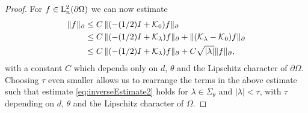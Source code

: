 \begin{proof}
  For $f \in \mathrm{L}^2_n(\partial\Omega)$ we can now estimate
  \begin{align*}
    \| f\|_\partial 
    &\leq C\,  \|(-(1/2)I + \mathcal{K}_0) f \|_\partial  \\
    &\leq C\,  \|(-(1/2)I + \mathcal{K}_\lambda)f \|_\partial + \|(\mathcal{K}_\lambda - \mathcal{K}_0)f\|_\partial \\
    &\leq C\,  \|(-(1/2)I + \mathcal{K}_\lambda)f\|_\partial + C \sqrt{|\lambda|} \|f\|_\partial,
  \end{align*}
  with a constant $C$ which depends only on $d$, $\theta$ and the Lipschitz character of $\partial\Omega$.
  Choosing $\tau$ even smaller allows us to rearrange the terms in the above estimate such that estimate \eqref{eq:inverseEstimate2} holds for $\lambda \in \Sigma_\theta$ and $|\lambda| < \tau$, with $\tau$ depending on $d$, $\theta$ and the Lipschitz character of $\Omega$.


\end{proof}
